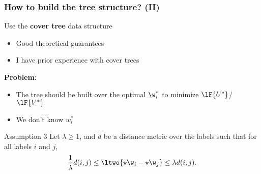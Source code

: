 \begin{frame}
\frametitle{How to build the tree structure? (II)}

Use the \textbf{cover tree} data structure
\begin{itemize}
\item Good theoretical guarantees
\item I have prior experience with cover trees \citep{izbicki2015faster}
\end{itemize}



\vspace{0.1in}
\textbf{Problem:}
\begin{itemize}
\item The tree should be built over the optimal $\w_i^*$ to minimize $\lF{U^*}$/$\lF{V^*}$
\item We don't know $w_i^*$
\end{itemize}

\vspace{0.1in}
\begin{block}{Assumption 3}
    \label{ass:metric}
    Let $\lambda \ge 1$, and $d$ be a distance metric over the labels such that for all labels $i$ and $j$,
\begin{equation}
    \frac 1 \lambda d(i,j)
    \le \ltwo{\star \w_i - \star \w_j}
    \le \lambda d(i, j).
\end{equation}
\end{block}

\end{frame}

